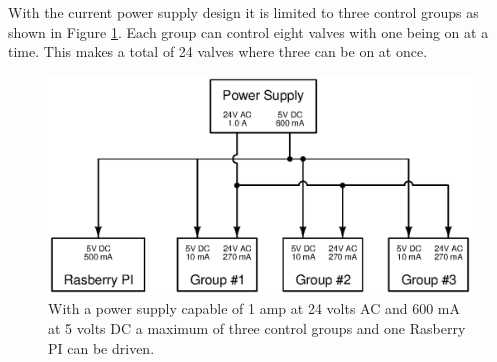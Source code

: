\documentclass{article}
\begin{document}
With the current power supply design it is limited to three
control groups as shown in Figure \ref{fig:expansion_current}.
Each group can control eight valves with one being on at a time.
This makes a total of 24 valves where three can be on at once.

\begin{figure}[hbp]
\centering
\includegraphics[angle=0,scale=0.80]{xcircuit/expansion_current}
\caption{With a power supply capable of 1 amp at 24 volts AC and
600 mA at 5 volts DC a maximum of three control groups and one
Rasberry PI can be driven.}\label{fig:expansion_current}
\end{figure}


\pagebreak
\printbibliography
\end{document}
